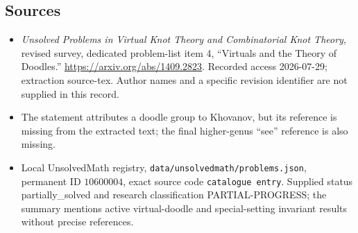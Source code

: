\documentclass[11pt]{article}
\begin{document}
\subsection{Sources}
\begin{itemize}
\item \emph{Unsolved Problems in Virtual Knot Theory and Combinatorial Knot Theory}, revised survey, dedicated problem-list item 4, ``Virtuals and the Theory of Doodles.'' \url{https://arxiv.org/abs/1409.2823}. Recorded access 2026-07-29; extraction source-tex. Author names and a specific revision identifier are not supplied in this record.
\item The statement attributes a doodle group to Khovanov, but its reference is missing from the extracted text; the final higher-genus ``see'' reference is also missing.
\item Local UnsolvedMath registry, \texttt{data/unsolvedmath/problems.json}, permanent ID \(10600004\), exact source code \texttt{catalogue entry}. Supplied status partially\_solved and research classification PARTIAL-PROGRESS; the summary mentions active virtual-doodle and special-setting invariant results without precise references.
\end{itemize}
\end{document}
